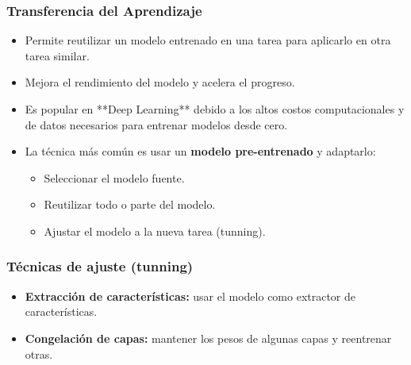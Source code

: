 \begin{frame}
    \frametitle{Transferencia del Aprendizaje}

    \begin{itemize}[leftmargin=*]
        \item Permite reutilizar un modelo entrenado en una tarea para aplicarlo en otra tarea similar.
        \item Mejora el rendimiento del modelo y acelera el progreso.
        \item Es popular en **Deep Learning** debido a los altos costos computacionales y de datos necesarios para entrenar modelos desde cero.
        \item La técnica más común es usar un \textbf{modelo pre-entrenado} y adaptarlo:
        \begin{itemize}
            \item Seleccionar el modelo fuente.
            \item Reutilizar todo o parte del modelo.
            \item Ajustar el modelo a la nueva tarea (tunning).
        \end{itemize}
    \end{itemize}

\end{frame}

\begin{frame}
    \frametitle{Técnicas de ajuste (tunning)}

        \begin{itemize}
            \item \textbf{Extracción de características:} usar el modelo como extractor de características.
            \item \textbf{Congelación de capas:} mantener los pesos de algunas capas y reentrenar otras.
        \end{itemize}


\end{frame}
